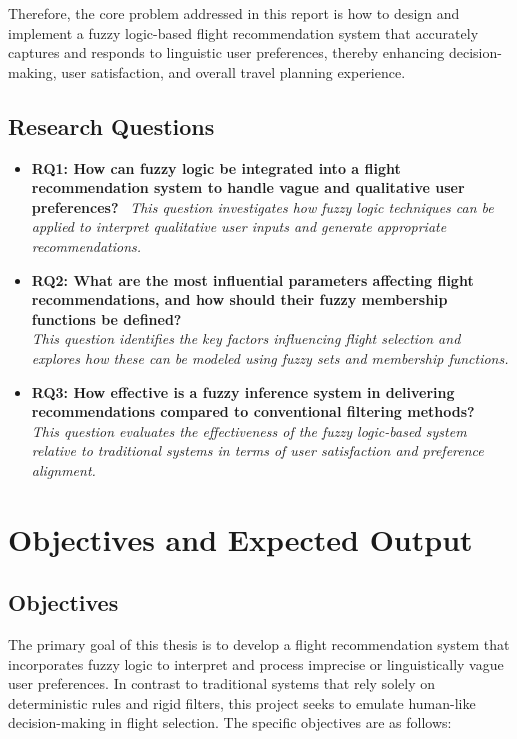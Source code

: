 \documentclass[a4paper]{article}
\begin{document}
Therefore, the core problem addressed in this report is how to design and implement a fuzzy logic-based flight recommendation system that accurately captures and responds to linguistic user preferences, thereby enhancing decision-making, user satisfaction, and overall travel planning experience.

\subsection{Research Questions}
\begin{itemize}
\item \textbf{RQ1: How can fuzzy logic be integrated into a flight recommendation system to handle vague and qualitative user preferences?}
\ \textit{This question investigates how fuzzy logic techniques can be applied to interpret qualitative user inputs and generate appropriate recommendations.}

\item \textbf{RQ2: What are the most influential parameters affecting flight recommendations, and how should their fuzzy membership functions be defined?}
\\ \textit{This question identifies the key factors influencing flight selection and explores how these can be modeled using fuzzy sets and membership functions.}

\item \textbf{RQ3: How effective is a fuzzy inference system in delivering recommendations compared to conventional filtering methods?}
\\ \textit{This question evaluates the effectiveness of the fuzzy logic-based system relative to traditional systems in terms of user satisfaction and preference alignment.}

\end{itemize}

\section{Objectives and Expected Output}
\subsection{Objectives}
The primary goal of this thesis is to develop a flight recommendation system that incorporates fuzzy logic to interpret and process imprecise or linguistically vague user preferences. In contrast to traditional systems that rely solely on deterministic rules and rigid filters, this project seeks to emulate human-like decision-making in flight selection. The specific objectives are as follows:
\end{document}
